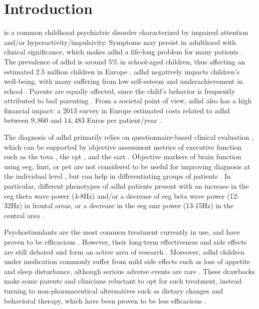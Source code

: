 

\section{Introduction} 

 is a common childhood psychiatric disorder characterized by impaired attention and/or hyperactivity/impulsivity.
Symptoms may persist in adulthood with clinical significance, which makes \gls{adhd} a life-long problem for many
patients \citep{Faraone2006}. The prevalence of \gls{adhd} is around 5\% in school-aged children, thus affecting an estimated
2.5 million children in Europe \citep{DSM-5}. \gls{adhd} negatively impacts children's well-being, with many suffering
from low self-esteem \citep{Shaw2005} and underachievement in school \citep{Barry2002}. Parents are equally affected, since 
the child's behavior is frequently attributed to bad parenting \citep{Harpin2005}. From a societal point
of view, \gls{adhd} also has a high financial impact: a 2013 survey in Europe estimated costs related to \gls{adhd} between $9,860$ and 
$14,483$ Euros per patient/year \citep{le2014}. 

The diagnosis of \gls{adhd} primarily relies on questionnaire-based clinical evaluation \citep{DSM-5}, which can be
supported by objective assessment metrics of executive function such as the \gls{tova} \citep{Forbes1998}, the
\gls{cpt} \citep{Barkley1991}, and the \gls{sart} \citep{Robertson1997}. Objective markers of brain function
using \gls{eeg}, \gls{fmri}, or \gls{pet} are not considered to be useful for improving diagnosis at the individual
level \citep{Neba}, but can help in differentiating groups of patients \citep{Johnstone2005}.  
In particular, different phenotypes of \gls{adhd} patients present with an increase in the \gls{eeg} theta wave 
power (4-8Hz) and/or a decrease of \gls{eeg} beta wave power (12-32Hz) in frontal areas, or a decrease in the \gls{eeg} 
\gls{smr} power (13-15Hz) in the central area \citep{Monastra2005, Matouvsek1984, Janzen1995, loo2017}.  

Psychostimulants are the most common treatment currently in use, and have proven to be efficacious
\citep{Taylor2014, Storebo2015}. However, their long-term effectiveness and side effects are still debated and form 
an active area of research \citep{DuPaul1998, Swanson2001, Jensen1999}. Moreover, \gls{adhd} children under medication 
commonly suffer from mild side effects such as loss of appetite and sleep disturbance, although serious adverse events
are rare \citep{Storebo2015, Cooper2011}. These drawbacks make some parents and clinicians reluctant to 
opt for such treatment, instead turning to non-pharmaceutical alternatives such as dietary changes \citep{Belanger2009} and behavioral 
therapy, which have been proven to be less efficacious \citep{Sonuga-Barke2013}.

